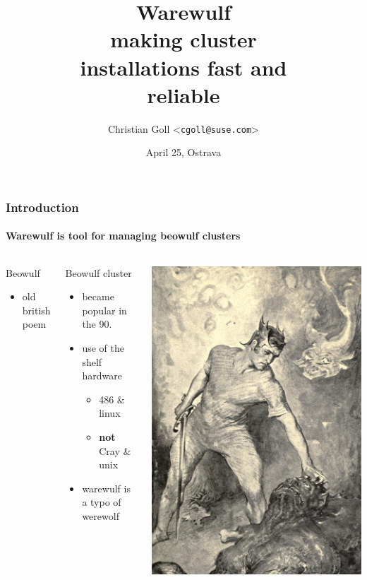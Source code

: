 \documentclass[aspectratio=169]{beamer}
\title{Warewulf\\
making cluster\\
installations fast and \\
reliable}
\date{April 25, Ostrava}
\author{Christian Goll <\texttt{cgoll@suse.com}>}
\begin{document}
\begin{frame}
\titlepage
\end{frame}
\begin{frame}[fragile]
\frametitle{Introduction}
\framesubtitle{Warewulf is tool for managing beowulf clusters}
\begin{columns}
\begin{block}{Beowulf}
  \begin{itemize}
    \item old british poem
  \end{itemize}
\end{block}
\begin{block}{Beowulf cluster}
  \begin{itemize}
    \item became popular in the 90.
    \item use of the shelf hardware
    \begin{itemize}
      \item 486 \& linux
      \item \textbf{not} Cray \& unix
    \end{itemize}
    \item warewulf is a typo of werewolf
  \end{itemize}
\end{block}
  \includegraphics[width=.6\linewidth]{Beowulf}
\end{columns}
\end{frame}
\end{document}
